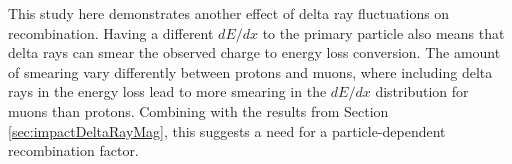 This study here demonstrates another effect of delta ray fluctuations on recombination.
Having a different $dE/dx$ to the primary particle also means that delta rays can smear the observed charge to energy loss conversion.
The amount of smearing vary differently between protons and muons, where including delta rays in the energy loss lead to more smearing in the $dE/dx$ distribution for muons than protons. 
Combining with the results from Section \ref{sec:impactDeltaRayMag}, this suggests a need for a particle-dependent recombination factor.   

%
%
